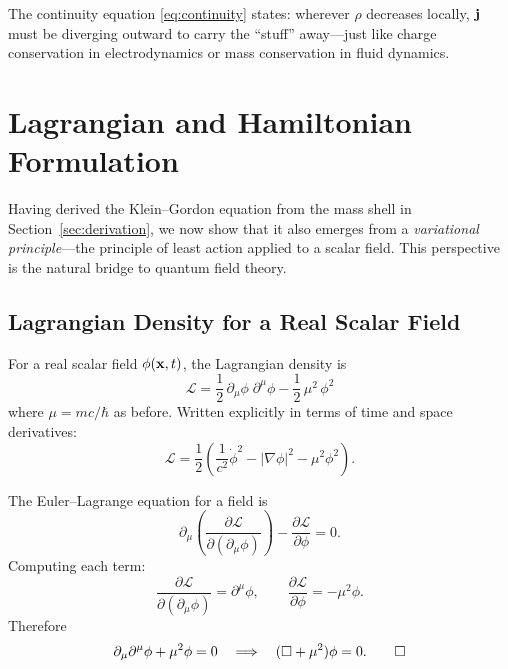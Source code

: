 \documentclass[12pt, a4paper]{article}
\theoremstyle{definition}
\begin{document}
The continuity equation \eqref{eq:continuity} states: wherever $\rho$
decreases locally, $\vb{j}$ must be diverging outward to carry the ``stuff''
away---just like charge conservation in electrodynamics or mass conservation
in fluid dynamics.

\section{Lagrangian and Hamiltonian Formulation}
\label{sec:lagrangian}

Having derived the Klein--Gordon equation from the mass shell in
Section~\ref{sec:derivation}, we now show that it also emerges from a
\emph{variational principle}---the principle of least action applied to a
scalar field.  This perspective is the natural bridge to quantum field theory.

\subsection{Lagrangian Density for a Real Scalar Field}

For a real scalar field $\phi(\vb{x},t)$, the Lagrangian density is
\begin{equation}\label{eq:lagrangian-real}
    \boxed{\;
    \mathcal{L}
    = \frac{1}{2}\,\partial_{\mu}\phi\;\partial^{\mu}\phi
    - \frac{1}{2}\,\mu^{2}\,\phi^{2}
    \;}
\end{equation}
where $\mu = mc/\hbar$ as before.  Written explicitly in terms of time and space derivatives:
\[
    \mathcal{L}
    = \frac{1}{2}\left(\frac{1}{c^{2}}\dot{\phi}^{2}
    - |\nabla\phi|^{2}
    - \mu^{2}\phi^{2}\right).
\]

\begin{derivation}
The Euler--Lagrange equation for a field is
\[
    \partial_{\mu}\!\left(
      \frac{\partial\mathcal{L}}{\partial(\partial_{\mu}\phi)}
    \right)
    - \frac{\partial\mathcal{L}}{\partial\phi} = 0.
\]
Computing each term:
\[
    \frac{\partial\mathcal{L}}{\partial(\partial_{\mu}\phi)}
    = \partial^{\mu}\phi,
    \qquad
    \frac{\partial\mathcal{L}}{\partial\phi}
    = -\mu^{2}\phi.
\]
Therefore
\[
    \partial_{\mu}\partial^{\mu}\phi + \mu^{2}\phi = 0
    \quad\Longrightarrow\quad
    (\Box + \mu^{2})\phi = 0. \qed
\]
\end{derivation}
\end{document}
